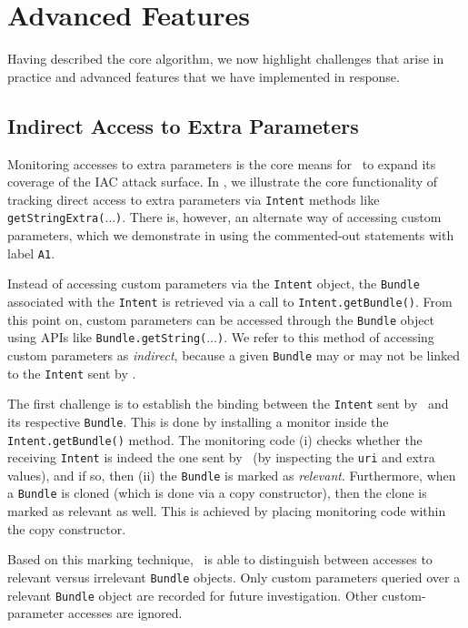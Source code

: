 \section{Advanced Features}

Having described the core algorithm, we now highlight challenges that arise in practice and advanced features that we have implemented in response.

\subsection{Indirect Access to Extra Parameters}\label{Se:indirectExtra}

Monitoring accesses to extra parameters is the core means for \Tool\ to expand its coverage of the IAC attack surface. In , we illustrate the core functionality of tracking direct access to extra parameters via {\tt Intent} methods like {\tt getStringExtra($\ldots$)}. There is, however, an alternate way of accessing custom parameters, which we demonstrate in  using the commented-out statements with label {\tt A1}.

Instead of accessing custom parameters via the {\tt Intent} object, the {\tt Bundle} associated with the {\tt Intent} is retrieved via a call to {\tt Intent.getBundle()}. From this point on, custom parameters can be accessed through the {\tt Bundle} object using APIs like {\tt Bundle.getString($\ldots$)}. We refer to this method of accessing custom parameters as \emph{indirect}, because a given {\tt Bundle} may or may not be linked to the {\tt Intent} sent by \Tool.

The first challenge is to establish the binding between the {\tt Intent} sent by \Tool\ and its respective {\tt Bundle}. This is done by installing a monitor inside the {\tt Intent.getBundle()} method. The monitoring code (i) checks whether the receiving {\tt Intent} is indeed the one sent by \Tool\ (by inspecting the {\tt uri} and extra values), and if so, then (ii) the {\tt Bundle} is marked as \emph{relevant}. Furthermore, when a {\tt Bundle} is cloned (which is done via a copy constructor), then the clone is marked as relevant as well. This is achieved by placing monitoring code within the copy constructor.

Based on this marking technique, \Tool\ is able to distinguish between accesses to relevant versus irrelevant {\tt Bundle} objects. Only custom parameters queried over a relevant {\tt Bundle} object are recorded for future investigation. Other custom-parameter accesses are ignored.

